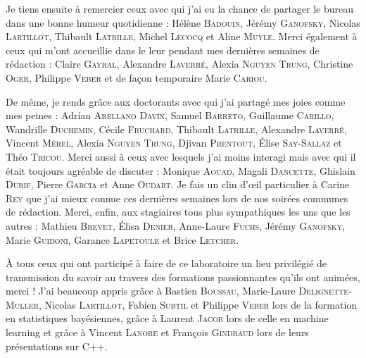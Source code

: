 Je tiens ensuite à remercier ceux avec qui j'ai eu la chance de partager le bureau dans une bonne humeur quotidienne : Hélène \textsc{Badouin}, Jérémy \textsc{Ganofsky}, Nicolas \textsc{Lartillot}, Thibault \textsc{Latrille}, Michel \textsc{Lecocq} et Aline \textsc{Muyle}.
Merci également à ceux qui m'ont accueillie dans le leur pendant mes dernières semaines de rédaction : Claire \textsc{Gayral}, Alexandre \textsc{Laverré}, Alexia \textsc{Nguyen Trung}, Christine \textsc{Oger}, Philippe \textsc{Veber} et de façon temporaire Marie \textsc{Cariou}.

De même, je rends gr\^ace aux doctorants avec qui j'ai partagé mes joies comme mes peines :
Adr\'ian \textsc{Arellano Dav\'in}, 
Samuel \textsc{Barreto},
Guillaume \textsc{Carillo},
Wandrille \textsc{Duchemin},
Cécile \textsc{Fruchard},
Thibault \textsc{Latrille},
Alexandre \textsc{Laverré},
Vincent \textsc{Mérel},
Alexia \textsc{Nguyen Trung},
Djivan \textsc{Prentout},
\'Elise \textsc{Say-Sallaz} et
Théo \textsc{Tricou}.
Merci aussi à ceux avec lesquels j'ai moins interagi mais avec qui il était toujours agréable de discuter : 
Monique \textsc{Aouad},
Magali \textsc{Dancette},
Ghislain \textsc{Durif},
Pierre \textsc{Garcia} et Anne \textsc{Oudart}.
Je fais un clin d'œil particulier à Carine \textsc{Rey} que j'ai mieux connue ces dernières semaines lors de nos soirées communes de rédaction.
Merci, enfin, aux stagiaires tous plus sympathiques les uns que les autres : Mathieu \textsc{Brevet}, \'Elisa \textsc{Denier}, Anne-Laure \textsc{Fuchs}, Jérémy \textsc{Ganofsky}, Marie \textsc{Guidoni}, Garance \textsc{Lapetoule} et Brice \textsc{Letcher}.

\`A tous ceux qui ont participé à faire de ce laboratoire un lieu privilégié de transmission du savoir au travers des formations passionnantes qu'ils ont animées, merci ! J'ai beaucoup appris gr\^ace à
Bastien \textsc{Boussau}, Marie-Laure \textsc{Delignette-Muller}, Nicolas \textsc{Lartillot}, Fabien \textsc{Subtil} et Philippe \textsc{Veber} lors de la formation en statistiques bayésiennes, gr\^ace à Laurent \textsc{Jacob} lors de celle en machine learning et gr\^ace à Vincent \textsc{Lanore} et François \textsc{Gindraud} lors de leurs présentations sur C++.



